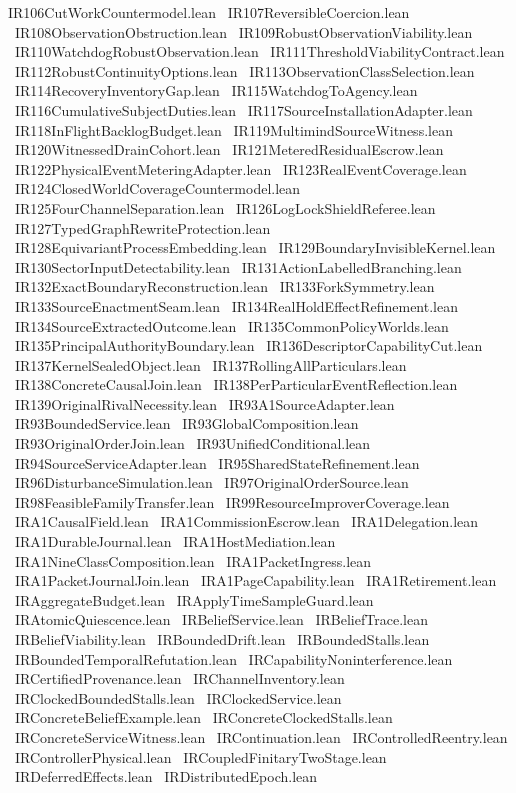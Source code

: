 IR106CutWorkCountermodel.lean \
IR107ReversibleCoercion.lean \
IR108ObservationObstruction.lean \
IR109RobustObservationViability.lean \
IR110WatchdogRobustObservation.lean \
IR111ThresholdViabilityContract.lean \
IR112RobustContinuityOptions.lean \
IR113ObservationClassSelection.lean \
IR114RecoveryInventoryGap.lean \
IR115WatchdogToAgency.lean \
IR116CumulativeSubjectDuties.lean \
IR117SourceInstallationAdapter.lean \
IR118InFlightBacklogBudget.lean \
IR119MultimindSourceWitness.lean \
IR120WitnessedDrainCohort.lean \
IR121MeteredResidualEscrow.lean \
IR122PhysicalEventMeteringAdapter.lean \
IR123RealEventCoverage.lean \
IR124ClosedWorldCoverageCountermodel.lean \
IR125FourChannelSeparation.lean \
IR126LogLockShieldReferee.lean \
IR127TypedGraphRewriteProtection.lean \
IR128EquivariantProcessEmbedding.lean \
IR129BoundaryInvisibleKernel.lean \
IR130SectorInputDetectability.lean \
IR131ActionLabelledBranching.lean \
IR132ExactBoundaryReconstruction.lean \
IR133ForkSymmetry.lean \
IR133SourceEnactmentSeam.lean \
IR134RealHoldEffectRefinement.lean \
IR134SourceExtractedOutcome.lean \
IR135CommonPolicyWorlds.lean \
IR135PrincipalAuthorityBoundary.lean \
IR136DescriptorCapabilityCut.lean \
IR137KernelSealedObject.lean \
IR137RollingAllParticulars.lean \
IR138ConcreteCausalJoin.lean \
IR138PerParticularEventReflection.lean \
IR139OriginalRivalNecessity.lean \
IR93A1SourceAdapter.lean \
IR93BoundedService.lean \
IR93GlobalComposition.lean \
IR93OriginalOrderJoin.lean \
IR93UnifiedConditional.lean \
IR94SourceServiceAdapter.lean \
IR95SharedStateRefinement.lean \
IR96DisturbanceSimulation.lean \
IR97OriginalOrderSource.lean \
IR98FeasibleFamilyTransfer.lean \
IR99ResourceImproverCoverage.lean \
IRA1CausalField.lean \
IRA1CommissionEscrow.lean \
IRA1Delegation.lean \
IRA1DurableJournal.lean \
IRA1HostMediation.lean \
IRA1NineClassComposition.lean \
IRA1PacketIngress.lean \
IRA1PacketJournalJoin.lean \
IRA1PageCapability.lean \
IRA1Retirement.lean \
IRAggregateBudget.lean \
IRApplyTimeSampleGuard.lean \
IRAtomicQuiescence.lean \
IRBeliefService.lean \
IRBeliefTrace.lean \
IRBeliefViability.lean \
IRBoundedDrift.lean \
IRBoundedStalls.lean \
IRBoundedTemporalRefutation.lean \
IRCapabilityNoninterference.lean \
IRCertifiedProvenance.lean \
IRChannelInventory.lean \
IRClockedBoundedStalls.lean \
IRClockedService.lean \
IRConcreteBeliefExample.lean \
IRConcreteClockedStalls.lean \
IRConcreteServiceWitness.lean \
IRContinuation.lean \
IRControlledReentry.lean \
IRControllerPhysical.lean \
IRCoupledFinitaryTwoStage.lean \
IRDeferredEffects.lean \
IRDistributedEpoch.lean \
